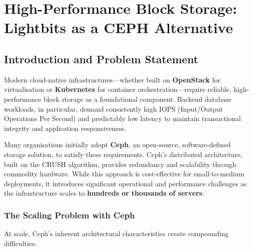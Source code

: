 \documentclass[12pt,a4paper,oneside]{report}
\begin{document}
\chapter[Block Storage with Lightbits]{High-Performance Block Storage: Lightbits as a CEPH Alternative}
\label{chap:lightbits}


\section{Introduction and Problem Statement}

Modern cloud-native infrastructures—whether built on \textbf{OpenStack} for virtualisation or \textbf{Kubernetes} for container orchestration—require reliable, high-performance block storage as a foundational component. Backend database workloads, in particular, demand consistently high IOPS (Input/Output Operations Per Second) and predictably low latency to maintain transactional integrity and application responsiveness.

Many organisations initially adopt \textbf{Ceph}, an open-source, software-defined storage solution, to satisfy these requirements. Ceph's distributed architecture, built on the CRUSH algorithm, provides redundancy and scalability through commodity hardware. While this approach is cost-effective for small-to-medium deployments, it introduces significant operational and performance challenges as the infrastructure scales to \textbf{hundreds or thousands of servers}.

\subsection{The Scaling Problem with Ceph}

At scale, Ceph's inherent architectural characteristics create compounding difficulties:
\end{document}
